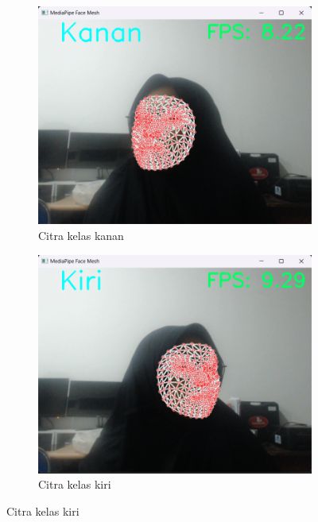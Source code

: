 \begin{figure}[H]
  \centering
  \begin{subfigure}{0.3\textwidth}
      \centering
      \includegraphics[width=\linewidth]{gambar/46 kanan.png}
      \caption{Citra kelas kanan}
      \label{fig:image1}
  \end{subfigure}
  \hfill
  \begin{subfigure}{0.3\textwidth}
      \centering
      \includegraphics[width=\linewidth]{gambar/46 kiri.png}
      \caption{Citra kelas kiri}
      \label{fig:image2}
  \end{subfigure}
  \hfill

\end{figure}
